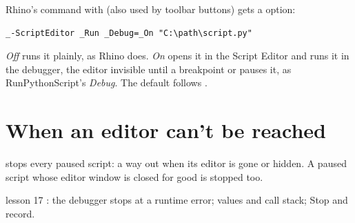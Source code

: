 Rhino's  command with  (also used by toolbar buttons) gets a  option:

\begin{lstlisting}[style=plain]
_-ScriptEditor _Run _Debug=_On "C:\path\script.py"
\end{lstlisting}

\emph{Off} runs it plainly, as Rhino does. \emph{On} opens it in the Script Editor and runs it in the debugger,
the editor invisible until a breakpoint or  pauses it, as RunPythonScript's \emph{Debug}. The
default follows .

\section{When an editor can't be reached}\label{sec:stoppaused}

 stops every paused script: a way out when its editor is gone or hidden. A paused
script whose editor window is closed for good is stopped too.

\begin{lesson}{lesson 17}
: the debugger stops at a runtime error; values and call stack; Stop and record.
\end{lesson}

